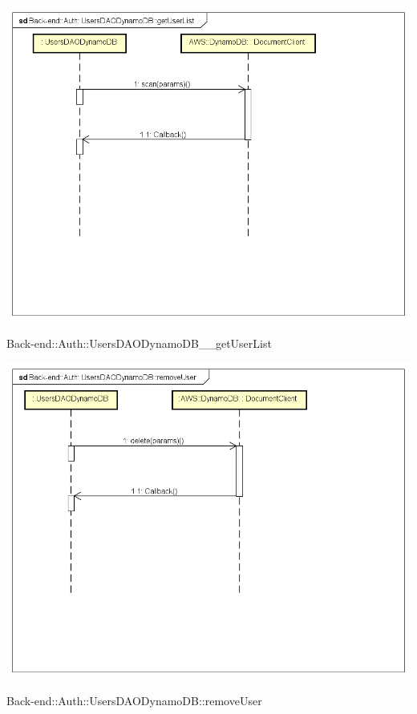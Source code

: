 \includegraphics[width=\textwidth,height=\textheight,keepaspectratio]{images/diagrams/back-end/Ufficial_Backend/Back-end__Auth__UsersDAODynamoDB__getUserList.png} 	\caption{Back-end::Auth::UsersDAODynamoDB__getUserList}
\includegraphics[width=\textwidth,height=\textheight,keepaspectratio]{images/diagrams/back-end/Ufficial_Backend/Back-end__Auth__UsersDAODynamoDB__removeUser.png} 	\caption{Back-end::Auth::UsersDAODynamoDB::removeUser}
